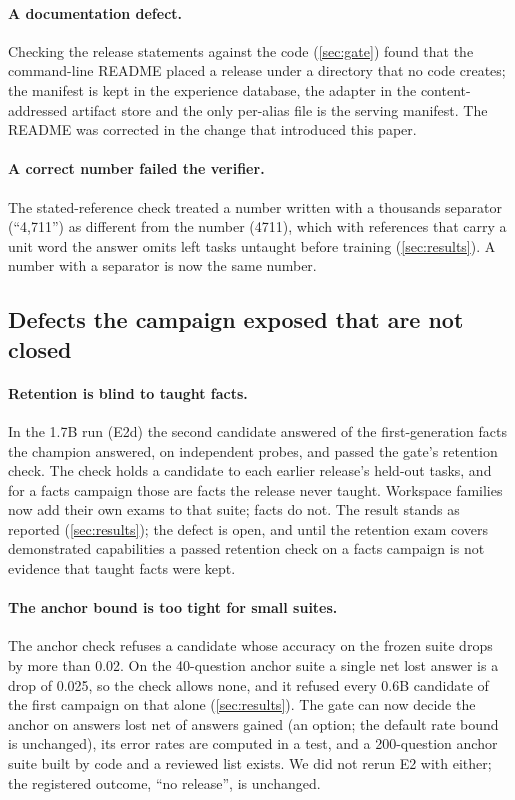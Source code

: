 \paragraph{A documentation defect.} Checking the release statements against the code
(\cref{sec:gate}) found that the command-line README placed a release under a directory that
no code creates; the manifest is kept in the experience database, the adapter in the
content-addressed artifact store and the only per-alias file is the serving manifest.
The README was corrected in the change that introduced this paper.

\paragraph{A correct number failed the verifier.} The stated-reference check treated a number
written with a thousands separator (``4,711'') as different from the number (4711), which with
references that carry a unit word the answer omits left tasks untaught before training
(\cref{sec:results}). A number with a separator is now the same number.


\subsection{Defects the campaign exposed that are not closed}\label{sec:open}

\paragraph{Retention is blind to taught facts.} In the 1.7B run (E2d) the second candidate
answered \mETwodCandidateGOneGZero{} of the \mETwodAfterGZeroGZero{} first-generation facts the champion answered, on independent probes,
and passed the gate's retention check. The check holds a candidate to each earlier
release's held-out tasks, and for a facts campaign those are facts the release never
taught. Workspace families now add their own exams to that suite; facts do
not. The result stands as reported (\cref{sec:results}); the defect is open, and until the
retention exam covers demonstrated capabilities a passed retention check on a facts campaign
is not evidence that taught facts were kept.

\paragraph{The anchor bound is too tight for small suites.} The anchor check refuses a
candidate whose accuracy on the frozen suite drops by more than 0.02. On the 40-question
anchor suite a single net lost answer is a drop of 0.025, so the check allows none, and it
refused every 0.6B candidate of the first campaign on that alone (\cref{sec:results}). The
gate can now decide the anchor on answers lost net of answers gained (an option; the default
rate bound is unchanged), its error rates are computed in a test, and a 200-question anchor
suite built by code and a reviewed list exists. We did not rerun E2 with either; the
registered outcome, ``no release'', is unchanged.

